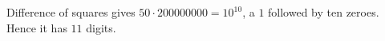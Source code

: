 Difference of squares gives $50\cdot200000000=10^{10}$, a $1$ followed by ten zeroes. Hence it has $\boxed{11}$ digits.
